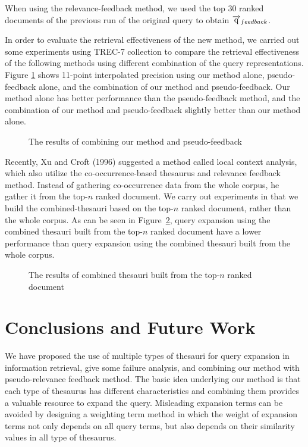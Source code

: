 When using the relevance-feedback method, we used the top 30 ranked documents of the previous run of the original query to obtain $\overrightarrow{\rm q}_{feedback}$.

In order to evaluate the retrieval effectiveness of the new method, we carried out some experiments using TREC-7 collection to compare the retrieval effectiveness of the following methods using different combination of the query representations. Figure \ref{fig:FeedbackCombination} shows  11-point interpolated precision using our method alone, pseudo-feedback alone, and the combination of our method and pseudo-feedback. Our method alone has better performance than the pseudo-feedback method, and the combination of our method and pseudo-feedback slightly better than our method alone.

\begin{figure} [htbp]
\begin{center}
  \caption{The results of combining our method and pseudo-feedback}
  \label{fig:FeedbackCombination}
\end{center}
\end{figure}


Recently, Xu and Croft (1996) suggested a method called local context analysis, which also utilize the co-occurrence-based thesaurus and relevance feedback method. Instead of gathering co-occurrence data from the whole corpus, he gather it from the top-$n$ ranked document.
We carry out experiments in that we build the combined-thesauri based on the top-$n$ ranked document, rather than the whole corpus. As can be seen in Figure~\ref{fig:FeedbackLCA}, query expansion using the combined thesauri built from the top-$n$ ranked document have a lower performance than query expansion using the combined thesauri built from the  whole corpus. 


\begin{figure} [htbp]
\begin{center}
  \caption{The results of combined thesauri built from the top-$n$ ranked document}
  \label{fig:FeedbackLCA}
\end{center}
\end{figure}




\section{Conclusions and Future Work}
We have proposed the use of multiple types of thesauri for query expansion in information retrieval, give some failure analysis, and combining our method with pseudo-relevance feedback method. The basic idea underlying our method is that each type of thesaurus has different characteristics and combining them provides a valuable resource to expand the query. Misleading expansion terms can be avoided by designing a weighting term method in which the weight of expansion terms not only depends on all query terms, but also depends on their similarity values in all type of thesaurus.
 

